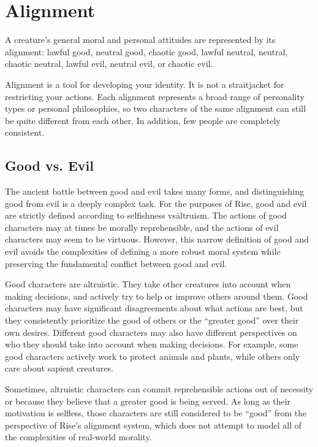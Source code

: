 \section{Alignment}\label{Alignment}
    A creature's general moral and personal attitudes are represented by its alignment: lawful good, neutral good, chaotic good, lawful neutral, neutral, chaotic neutral, lawful evil, neutral evil, or chaotic evil.

    Alignment is a tool for developing your identity.
    It is not a straitjacket for restricting your actions.
    Each alignment represents a broad range of personality types or personal philosophies, so two characters of the same alignment can still be quite different from each other.
    In addition, few people are completely consistent.

    \subsection{Good vs. Evil}
        The ancient battle between good and evil takes many forms, and distinguishing good from evil is a deeply complex task.
        For the purposes of Rise, good and evil are strictly defined according to selfishness vs\. altruism.
        The actions of good characters may at times be morally reprehensible, and the actions of evil characters may seem to be virtuous.
        However, this narrow definition of good and evil avoids the complexities of defining a more robust moral system while preserving the fundamental conflict between good and evil.

         Good characters are altruistic.
        They take other creatures into account when making decisions, and actively try to help or improve others around them.
        Good characters may have significant disagreements about what actions are best, but they consistently prioritize the good of others or the ``greater good'' over their own desires.
        Different good characters may also have different perspectives on who they should take into account when making decisions.
        For example, some good characters actively work to protect animals and plants, while others only care about sapient creatures.

        Sometimes, altruistic characters can commit reprehensible actions out of necessity or because they believe that a greater good is being served.
        As long as their motivation is selfless, those characters are still considered to be ``good'' from the perspective of Rise's alignment system, which does not attempt to model all of the complexities of real-world morality.

